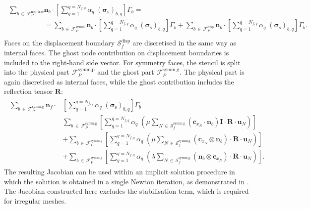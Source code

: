 \documentclass[sn-mathphys,Numbered]{sn-jnl}%
\newcommand{\bb}{\boldsymbol}
\begin{document}
\begin{appendices}
\begin{eqnarray}
\begin{split}
\sum_{b \,\in\, \mathcal{F}_P^{\text{non-trac}}}& \bb{n}_{b} \cdot \left[  \sum_{q=1}^{q=N_{f,q}}\alpha_q \; (\bb{\sigma}_\text{s})_{b,q} \right] \Gamma_b = \\
&=\sum_{b \,\in\, \mathcal{F}_P^{\text{symm}}} \bb{n}_{b} \cdot \left[  \sum_{q=1}^{q=N_{f,q}}\alpha_q \; (\bb{\sigma}_\text{s})_{b,q} \right] \Gamma_b 
+ \sum_{b \,\in\, \mathcal{F}_P^{\text{disp}}} \bb{n}_{b} \cdot \left[  \sum_{q=1}^{q=N_{f,q}}\alpha_q \; (\bb{\sigma}_\text{s})_{b,q} \right] \Gamma_b.\\
\end{split}
\end{eqnarray}
%
Faces on the displacement boundary $\mathcal{S}_f^{\text{disp}}$ are discretised in the same way as internal faces.
The ghost node contribution on displacement boundaries is included to the right-hand side vector.
For symmetry faces, the stencil is split into the physical part $\mathcal{F}_P^{\text{symm,p}}$ and the ghost part $\mathcal{F}_P^{\text{symm,g}}$.
The physical part is again discretised as internal faces, while the ghost contribution includes the reflection tensor $\bb{R}$:
%
\begin{eqnarray}
\begin{split}
\sum_{b \,\in\, \mathcal{F}_P^{\text{symm,g}}} \bb{n}_{f} \cdot &\left[  \sum_{q=1}^{q=N_{f,q}}\alpha_q \; (\bb{\sigma}_\text{s})_{b,q} \right] \Gamma_b 
= \\
& \sum_{b \,\in\, \mathcal{F}_P^{\text{symm,g}}} \left [ \sum_{q=1}^{q=N_{f,q}}\alpha_q \; \left(\mu \sum_{N\,\in\,\mathcal{S}_f^{\text{symm,g}}}(\bb{c}_{x_N}\cdot \bb{n}_b)\bb{I}\cdot \bb{R} \cdot \bb{u}_N  \right) \right] 
\\
&  
 +\sum_{b \,\in\, \mathcal{F}_P^{\text{symm,g}}} \left [ \sum_{q=1}^{q=N_{f,q}}\alpha_q \; \left(\mu \sum_{N\,\in\,\mathcal{S}_f^{\text{symm,g}}}(\bb{c}_{x_N} \otimes \bb{n}_b) \cdot \bb{R} \cdot \bb{u}_N  \right) \right] \\
& 
+\sum_{b \,\in\, \mathcal{F}_P^{\text{symm,g}}} \left [ \sum_{q=1}^{q=N_{f,q}}\alpha_q \; \left(\lambda \sum_{N\,\in\,\mathcal{S}_f^{\text{symm,g}}}(\bb{n}_b \otimes \bb{c}_{x_N}) \cdot \bb{R} \cdot \bb{u}_N \right) \right] .
\end{split}
\end{eqnarray}
%
The resulting Jacobian can be used within an implicit solution procedure in which the solution is obtained in a single Newton iteration, as demonstrated in \cite{Castrillo2022}.
The Jacobian constructed here excludes the stabilisation term, which is required for irregular meshes. 
%
%
%

\end{appendices}
\end{document}
